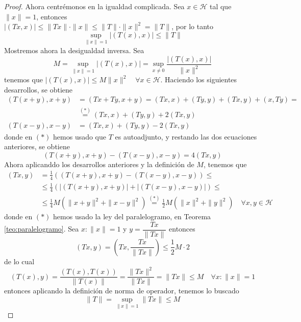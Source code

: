 \begin{teo}
\begin{proof}
    \noindent
    Ahora centrémonos en la igualdad complicada. Sea $x \in \mathcal{H}$ tal que $\|x\| = 1$, entonces \\ \mbox{$|(Tx, x)| \le \|Tx\| \cdot \|x\| \le \|T\| \cdot \|x\|^2 = \|T\|$}, por lo tanto
    \[ \sup_{\|x\|=1} |(T(x), x)| \le \|T\| \]
    Mostremos ahora la desigualdad inversa. Sea 
    $$M = \sup_{\|x\|=1} |(T(x), x)| = \sup_{x \neq 0} \frac{|(T(x), x)|}{\|x\|^2}$$
    tenemos que $|(T(x), x)| \le M \|x\|^2 \quad \forall x \in \mathcal{H}$. Haciendo los siguientes desarrollos, se obtiene
    \begin{align*}
        (T(x+y), x+y) &= (Tx + Ty, x+y) = (Tx, x) + (Ty, y) + (Tx, y) + (x, Ty)= \\
        &\overset{(*)}{=} (Tx, x) + (Ty, y) + 2(Tx, y) \\
        (T(x-y), x-y) &= (Tx, x) + (Ty, y) - 2(Tx, y)
    \end{align*}
    donde en $(*)$ hemos usado que $T$ es autoadjunto, y restando las dos ecuaciones anteriores, se obtiene
    \begin{equation*}
        (T(x+y), x+y) - (T(x-y), x-y) = 4(Tx, y)
    \end{equation*}
    Ahora aplicanddo los desarrollos anteriores y la definición de $M$, tenemos que
    \begin{align*}
        (Tx, y) &= \frac{1}{4} \left( (T(x+y), x+y) - (T(x-y), x-y) \right)\leq \\
        &\le \frac{1}{4} \left( |(T(x+y), x+y)| + |(T(x-y), x-y)| \right) \leq\\
        &\le \frac{1}{4} M \left( \|x+y\|^2 + \|x-y\|^2 \right) \overset{(*)}{=} \frac{1}{2} M (\|x\|^2 + \|y\|^2) \quad \forall x, y \in \mathcal{H}
    \end{align*}
    donde en $(*)$ hemos usado la ley del paralelogramo, en Teorema \ref{teo:paralelogramo}. Sea $x : \|x\|=1$ y $y = \dfrac{Tx}{\|Tx\|}$ entonces 
    $$(Tx, y) = \left( Tx, \frac{Tx}{\|Tx\|} \right) \le \frac{1}{2} M \cdot 2$$
    de lo cual
    \begin{equation*}
        (T(x), y) = \dfrac{(T(x),T(x))}{\|T(x)\|}=\frac{\|Tx\|^2}{\|Tx\|} = \|Tx\| \le M \quad \forall x : \|x\|=1
    \end{equation*}
    entonces aplicando la definición de norma de operador, tenemos lo buscado
    \begin{equation*}
        \|T\| = \sup_{\|x\|=1} \|Tx\| \le M
    \end{equation*}
\end{proof}
\end{teo}

